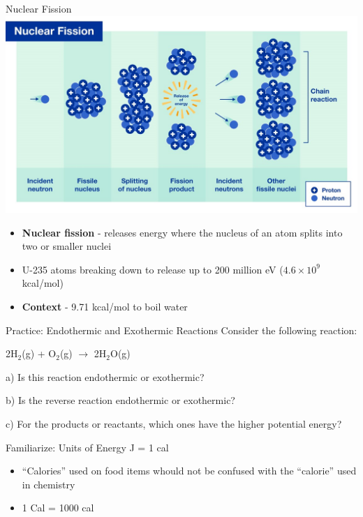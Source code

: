 \documentclass[11pt]{beamer}
\begin{document}
\begin{frame}{Nuclear Fission}
  \centering
  \includegraphics[width=0.8\linewidth]{nuclear_fission}

  \begin{itemize}
  \item \textbf{Nuclear fission} - releases energy where the
    nucleus of an atom splits into two or smaller nuclei
  \item U-235 atoms breaking down to release up to 200 million
    eV ($4.6\times 10^9$ kcal/mol)
  \item \textbf{Context} - 9.71 kcal/mol to boil water
  \end{itemize}
\end{frame}

\begin{frame}{Practice: Endothermic and Exothermic Reactions}
  Consider the following reaction:

  2H$_2$(g) + O$_2$(g) $\rightarrow$ 2H$_2$O(g)

  a) Is this reaction endothermic or exothermic?

  b) Is the reverse reaction endothermic or exothermic?

  c) For the products or reactants, which ones have the higher
  potential energy?

\end{frame}

\begin{frame}{Familiarize: Units of Energy}
   J = 1 cal

  \begin{itemize}
  \item ``Calories'' used on food items whould not be confused
    with the ``calorie'' used in chemistry
  \item 1 Cal = 1000 cal
  \end{itemize}
\end{frame}
\end{document}
